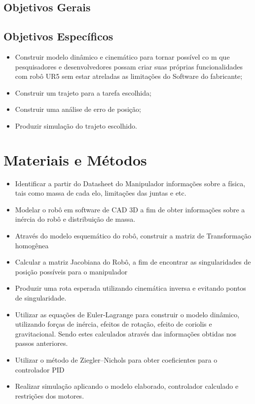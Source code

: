 \subsection{Objetivos Gerais}

\subsection{Objetivos Específicos}
 \begin{itemize}
   \item Construir modelo dinâmico e cinemático para tornar possível co m que pesquisadores e desenvolvedores possam criar suas próprias funcionalidades com robô UR5 sem estar atreladas as limitações do Software do fabricante; 
   \item Construir um trajeto para a tarefa escolhida;
   \item Construir uma análise de erro de posição;
    \item Produzir simulação do trajeto escolhido.   
    \linebreak[5]
 \end{itemize}
 
 
\section{Materiais e Métodos} %
 \begin{itemize}
    \item Identificar a partir do Datasheet do Manipulador informações sobre a física, tais como massa de cada elo, limitações das juntas e etc.
    \item Modelar o robô em software de CAD 3D a fim de obter informações sobre a inércia do robô e distribuição de massa.
    \item Através do modelo esquemático do robô, construir a matriz de Transformação homogênea
    \item Calcular a matriz Jacobiana do Robô, a fim de encontrar as singularidades de posição possíveis para o manipulador
    \item Produzir uma rota esperada utilizando cinemática inversa e evitando pontos de singularidade.
    \item Utilizar as equações de Euler-Lagrange para construir o modelo dinâmico, utilizando forças de inércia, efeitos de rotação, efeito de coriolis e gravitacional. Sendo estes calculados através das informações obtidas nos passos anteriores.
    \item Utilizar o método de Ziegler–Nichols para obter coeficientes para o controlador PID
    \item Realizar simulação aplicando o modelo elaborado, controlador calculado e restrições dos motores.
 \end{itemize}

